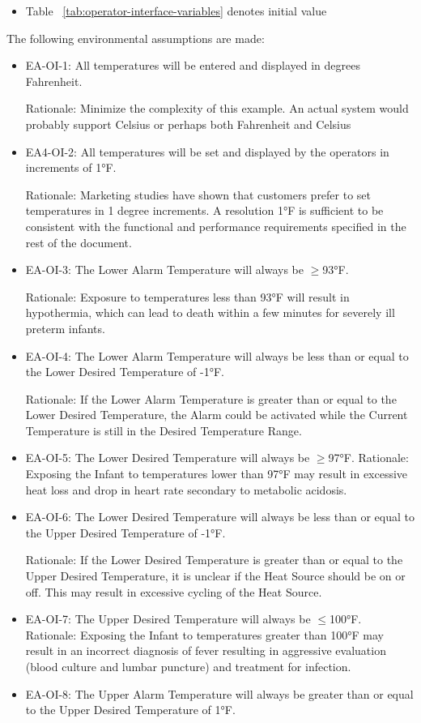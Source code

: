 \begin{itemize}
\item Table ~\ref{tab:operator-interface-variables} denotes initial value
\end{itemize}

The following environmental assumptions are made:

\begin{itemize}
\item EA-OI-1: All temperatures will be entered and displayed in degrees Fahrenheit.

      Rationale: Minimize the complexity of this example. An actual system would probably
      support Celsius or perhaps both Fahrenheit and Celsius
\item EA4-OI-2: All temperatures will be set and displayed by the operators in increments of
      1°F.

      Rationale: Marketing studies have shown that customers prefer to set temperatures in
      1 degree increments. A resolution 1°F is sufficient to be consistent with the functional
      and performance requirements specified in the rest of the document.
\item EA-OI-3: The Lower Alarm Temperature will always be $\geq$93°F.

      Rationale: Exposure to temperatures less than 93°F will result in hypothermia, which can
      lead to death within a few minutes for severely ill preterm infants.
\item EA-OI-4: The Lower Alarm Temperature will always be less than or equal to the Lower
      Desired Temperature of -1°F.

      Rationale: If the Lower Alarm Temperature is greater than or equal to the Lower Desired
      Temperature, the Alarm could be activated while the Current Temperature is still in the
      Desired Temperature Range.
\item EA-OI-5: The Lower Desired Temperature will always be $\geq$97°F.
      Rationale: Exposing the Infant to temperatures lower than 97°F may result in excessive
      heat loss and drop in heart rate secondary to metabolic acidosis.
\item EA-OI-6: The Lower Desired Temperature will always be less than or equal to the Upper
      Desired Temperature of -1°F.

      Rationale: If the Lower Desired Temperature is greater than or equal to the Upper
      Desired Temperature, it is unclear if the Heat Source should be on or off. This may result
      in excessive cycling of the Heat Source.
\item EA-OI-7: The Upper Desired Temperature will always be $\leq$100°F.
      Rationale: Exposing the Infant to temperatures greater than 100°F may result in an
      incorrect diagnosis of fever resulting in aggressive evaluation (blood culture and lumbar
      puncture) and treatment for infection.
\item EA-OI-8: The Upper Alarm Temperature will always be greater than or equal to the
      Upper Desired Temperature of 1°F.


\end{itemize}

